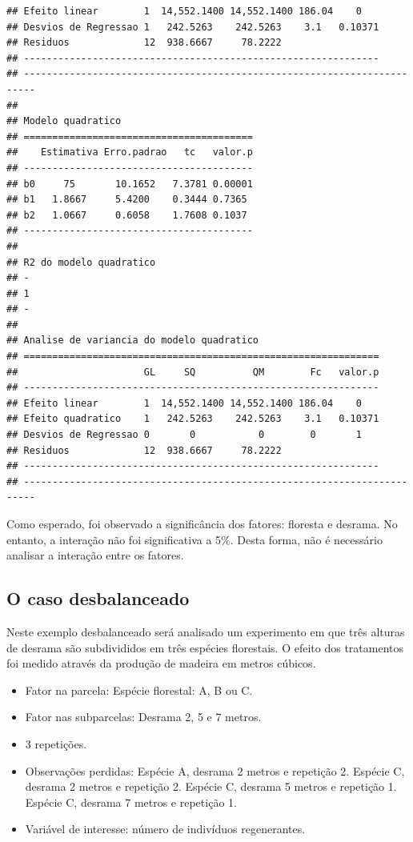 \documentclass[
]{article}
\providecommand{\tightlist}{%
  \setlength{\itemsep}{0pt}\setlength{\parskip}{0pt}}
\begin{document}
\begin{verbatim}
## Efeito linear        1  14,552.1400 14,552.1400 186.04    0   
## Desvios de Regressao 1   242.5263    242.5263    3.1   0.10371
## Residuos             12  938.6667     78.2222                 
## --------------------------------------------------------------
## ------------------------------------------------------------------------
## 
## Modelo quadratico
## ========================================
##    Estimativa Erro.padrao   tc   valor.p
## ----------------------------------------
## b0     75       10.1652   7.3781 0.00001
## b1   1.8667     5.4200    0.3444 0.7365 
## b2   1.0667     0.6058    1.7608 0.1037 
## ----------------------------------------
## 
## R2 do modelo quadratico
## -
## 1
## -
## 
## Analise de variancia do modelo quadratico
## ==============================================================
##                      GL     SQ          QM        Fc   valor.p
## --------------------------------------------------------------
## Efeito linear        1  14,552.1400 14,552.1400 186.04    0   
## Efeito quadratico    1   242.5263    242.5263    3.1   0.10371
## Desvios de Regressao 0       0           0        0       1   
## Residuos             12  938.6667     78.2222                 
## --------------------------------------------------------------
## ------------------------------------------------------------------------
\end{verbatim}

Como esperado, foi observado a significância dos fatores: floresta e desrama. No entanto, a interação não foi significativa a 5\%. Desta forma, não é necessário analisar a interação entre os fatores.

\hypertarget{o-caso-desbalanceado-4}{%
\subsection{O caso desbalanceado}\label{o-caso-desbalanceado-4}}

Neste exemplo desbalanceado será analisado um experimento em que três alturas de desrama são subdivididos em três espécies florestais. O efeito dos tratamentos foi medido através da produção de madeira em metros cúbicos.

\begin{itemize}
\tightlist
\item
  Fator na parcela: Espécie florestal: A, B ou C.
\item
  Fator nas subparcelas: Desrama 2, 5 e 7 metros.
\item
  3 repetições.
\item
  Observações perdidas: Espécie A, desrama 2 metros e repetição 2. Espécie C, desrama 2 metros e repetição 2. Espécie C, desrama 5 metros e repetição 1. Espécie C, desrama 7 metros e repetição 1.
\item
  Variável de interesse: número de indivíduos regenerantes.
\end{itemize}
\end{document}
